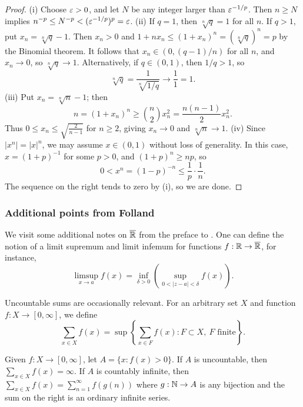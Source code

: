\documentclass[12pt]{article} %
\begin{document}
\begin{proof}
    (i) Choose $\varepsilon > 0$, and let $N$ be any integer larger than $\varepsilon^{-1/p}$. Then $n \geq N$ implies $n^{-p} \leq N^{-p} < (\varepsilon^{-1/p})^p = \varepsilon$. (ii) If $q = 1$, then $\sqrt[n]{q} = 1$ for all $n$. If $q > 1$, put $x_n = \sqrt[n]{q} - 1$. Then $x_n > 0$ and $1 + nx_n \leq (1 + x_n)^n = (\sqrt[n]{q})^n = p$ by the Binomial theorem. It follows that $x_n \in (0, (q - 1)/n)$ for all $n$, and $x_n \to 0$, so $\sqrt[n]{q} \to 1$. Alternatively, if $q \in (0, 1)$, then $1/q > 1$, so \[\sqrt[n]{q} = \frac{1}{\sqrt[n]{1/q}} \to \frac{1}{1} = 1.\] (iii) Put $x_n = \sqrt[n]{n} - 1$; then \[n = (1 + x_n)^n \geq \binom{n}{2}x_n^2 = \frac{n(n-1)}{2}x_n^2.\] Thus $0 \leq x_n \leq \sqrt{\frac{2}{n-1}}$ for $n \geq 2$, giving $x_n \to 0$ and $\sqrt[n]{n} \to 1$. (iv) Since $|x^n| = |x|^n$, we may assume $x \in (0, 1)$ without loss of generality. In this case, $x = (1 + p)^{-1}$ for some $p > 0$, and $(1 + p)^{n} \geq np$, so \[0 < x^n = (1 - p)^{-n} \leq \frac{1}{p} \cdot \frac{1}{n}.\] The sequence on the right tends to zero by (i), so we are done.
\end{proof}


\subsubsection{Additional points from Folland}\label{sec:folland-R-extended}

We visit some additional notes on $\overline{\mathbb{R}}$ from the preface to \citet{folland1999real}. One can define the notion of a limit supremum and limit infemum for functions $f : \mathbb{R} \to \overline{\mathbb{R}}$, for instance, \[\limsup_{x \to a} f(x) = \inf_{\delta > 0} \left( \sup_{0 < |z-a| < \delta} f(x) \right).\]

Uncountable sums are occasionally relevant. For an arbitrary set $X$ and function $f : X \to [0,\infty]$, we define \[\sum_{x \in X} f(x) = \sup \left\{\sum_{x \in F} f(x) : F \subset X, \ \text{$F$ finite}\right\}.\]

\begin{proposition}
    Given $f : X \to [0,\infty]$, let $A = \{x : f(x) > 0\}$. If $A$ is uncountable, then $\sum_{x \in X}f(x) = \infty$. If $A$ is countably infinite, then $\sum_{x \in X} f(x) = \sum_{n=1}^{\infty}f(g(n))$ where $g : \mathbb{N} \to A$ is any bijection and the sum on the right is an ordinary infinite series.
\end{proposition}
\end{document}
